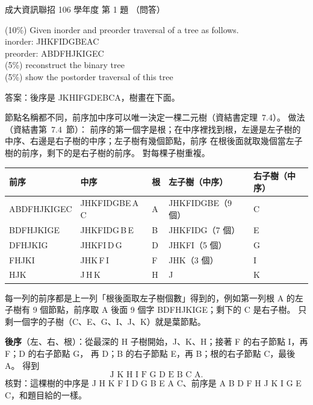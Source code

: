 \begin{pastexam}[label={px:ncku-106-prog-01}]{成大資訊聯招 106 學年度 第 1 題}
（問答）

(10\%) Given inorder and preorder traversal of a tree as follows.\\
inorder: JHKFIDGBEAC\\
preorder: ABDFHJKIGEC\\
(5\%) reconstruct the binary tree\\
(5\%) show the postorder traversal of this tree
\end{pastexam}

\begin{pastsoln}
答案：後序是 JKHIFGDEBCA，樹畫在下面。

節點名稱都不同，前序加中序可以唯一決定一棵二元樹（資結書定理~7.4）。 做法（資結書第~7.4~節）：
前序的第一個字是根；在中序裡找到根，左邊是左子樹的中序、右邊是右子樹的中序；左子樹有幾個節點，前序
在根後面就取幾個當左子樹的前序，剩下的是右子樹的前序。 對每棵子樹重複。

\begin{center}
\small
\begin{tabular}{lllll}
\toprule
前序 & 中序 & 根 & 左子樹（中序） & 右子樹（中序） \\
\midrule
ABDFHJKIGEC & JHKFIDGBE\,A\,C & A & JHKFIDGBE（9 個） & C \\
BDFHJKIGE & JHKFIDG\,B\,E & B & JHKFIDG（7 個） & E \\
DFHJKIG & JHKFI\,D\,G & D & JHKFI（5 個） & G \\
FHJKI & JHK\,F\,I & F & JHK（3 個） & I \\
HJK & J\,H\,K & H & J & K \\
\bottomrule
\end{tabular}
\end{center}

每一列的前序都是上一列「根後面取左子樹個數」得到的，例如第一列根 A 的左子樹有 9 個節點，前序取 A 後面
9 個字 BDFHJKIGE；剩下的 C 是右子樹。 只剩一個字的子樹（C、E、G、I、J、K）就是葉節點。

\begin{center}
\end{center}

\textbf{後序}（左、右、根）：從最深的 H 子樹開始，J、K、H；接著 F 的右子節點 I，再 F；D 的右子節點 G，
再 D；B 的右子節點 E，再 B；根的右子節點 C，最後 A。 得到
\[
\text{J K H I F G D E B C A}.
\]
核對：這棵樹的中序是 J H K F I D G B E A C、前序是 A B D F H J K I G E C，和題目給的一樣。
\end{pastsoln}
